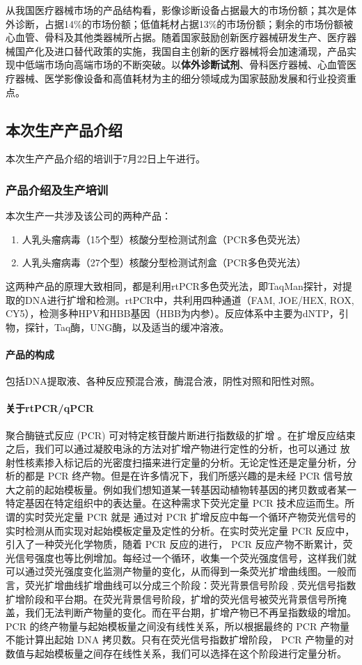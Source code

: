 \documentclass[cn,black,12pt,normal]{elegantnote}
\begin{document}
从我国医疗器械市场的产品结构看，影像诊断设备占据最大的市场份额；其次是体外诊断，占据14\%的市场份额；低值耗材占据13\%的市场份额；剩余的市场份额被心血管、骨科及其他类器械所占据。随着国家鼓励创新医疗器械研发生产、医疗器械国产化及进口替代政策的实施，我国自主创新的医疗器械将会加速涌现，产品实现中低端市场向高端市场的不断突破。以\textbf{体外诊断试剂}、骨科医疗器械、心血管医疗器械、医学影像设备和高值耗材为主的细分领域成为国家鼓励发展和行业投资重点。

\subsection{本次生产产品介绍}
本次生产产品介绍的培训于7月22日上午进行。

\subsubsection{产品介绍及生产培训} 本次生产一共涉及该公司的两种产品：
\begin{enumerate}
    \item 人乳头瘤病毒（15个型）核酸分型检测试剂盒（PCR多色荧光法）
    \item 人乳头瘤病毒（27个型）核酸分型检测试剂盒（PCR多色荧光法）
\end{enumerate}

这两种产品的原理大致相同，都是利用rtPCR多色荧光法，即TaqMan探针，对提取的DNA进行扩增和检测。rtPCR中，共利用四种通道（FAM, JOE/HEX, ROX, CY5），检测多种HPV和HBB基因（HBB为内参）。反应体系中主要为dNTP，引物，探针，Taq酶，UNG酶，以及适当的缓冲溶液。

\paragraph{产品的构成} 包括DNA提取液、各种反应预混合液，酶混合液，阴性对照和阳性对照。

\paragraph{关于rtPCR/qPCR} 聚合酶链式反应 (PCR) 可对特定核苷酸片断进行指数级的扩增 。在扩增反应结束之后，我们可以通过凝胶电泳的方法对扩增产物进行定性的分析，也可以通过 放射性核素掺入标记后的光密度扫描来进行定量的分析。无论定性还是定量分析，分析的都是 PCR 终产物。但是在许多情况下，我们所感兴趣的是未经 PCR 信号放大之前的起始模板量。例如我们想知道某一转基因动植物转基因的拷贝数或者某一特定基因在特定组织中的表达量。在这种需求下荧光定量 PCR 技术应运而生。所谓的实时荧光定量 PCR 就是 通过对 PCR 扩增反应中每一个循环产物荧光信号的实时检测从而实现对起始模板定量及定性的分析。在实时荧光定量 PCR 反应中，引入了一种荧光化学物质，随着 PCR 反应的进行， PCR 反应产物不断累计，荧光信号强度也等比例增加。每经过一个循环，收集一个荧光强度信号，这样我们就可以通过荧光强度变化监测产物量的变化，从而得到一条荧光扩增曲线图。一般而言，荧光扩增曲线扩增曲线可以分成三个阶段：荧光背景信号阶段 , 荧光信号指数扩增阶段和平台期。在荧光背景信号阶段，扩增的荧光信号被荧光背景信号所掩盖，我们无法判断产物量的变化。而在平台期，扩增产物已不再呈指数级的增加。 PCR 的终产物量与起始模板量之间没有线性关系，所以根据最终的 PCR 产物量不能计算出起始 DNA 拷贝数。只有在荧光信号指数扩增阶段， PCR 产物量的对数值与起始模板量之间存在线性关系，我们可以选择在这个阶段进行定量分析。
\end{document}

